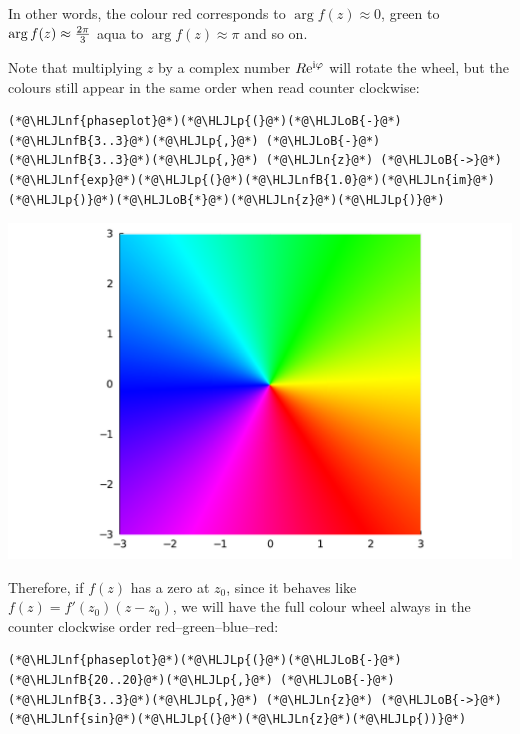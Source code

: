 \documentclass[12pt,a4paper]{article}
\newcommand{\HLJLn}[1]{#1}
\newcommand{\HLJLnf}[1]{\textcolor[RGB]{66,102,213}{#1}}
\newcommand{\HLJLnfB}[1]{\textcolor[RGB]{59,151,46}{#1}}
\newcommand{\HLJLoB}[1]{\textcolor[RGB]{102,102,102}{\textbf{#1}}}
\newcommand{\HLJLp}[1]{#1}
\def\I{ {\rm i} }
\def\E{ {\rm e} }
\def\endash{–}
\begin{document}
In other words, the colour red corresponds to $\arg f(z) \approx 0$, green to $\arg f(z) \approx {2 \pi \over 3}$ aqua to $\arg f(z) \approx \pi$ and so on.

Note that multiplying $z$ by a complex number $R \E^{\I \varphi}$ will rotate the wheel, but the colours still appear in the same order when read counter clockwise:


\begin{lstlisting}
(*@\HLJLnf{phaseplot}@*)(*@\HLJLp{(}@*)(*@\HLJLoB{-}@*)(*@\HLJLnfB{3..3}@*)(*@\HLJLp{,}@*) (*@\HLJLoB{-}@*)(*@\HLJLnfB{3..3}@*)(*@\HLJLp{,}@*) (*@\HLJLn{z}@*) (*@\HLJLoB{->}@*) (*@\HLJLnf{exp}@*)(*@\HLJLp{(}@*)(*@\HLJLnfB{1.0}@*)(*@\HLJLn{im}@*)(*@\HLJLp{)}@*)(*@\HLJLoB{*}@*)(*@\HLJLn{z}@*)(*@\HLJLp{)}@*)
\end{lstlisting}

\includegraphics[width=\linewidth]{jl_z7eR69/Lecture1_6_1.pdf}

Therefore, if $f(z)$ has a zero at $z_0$, since it behaves like $f(z) = f'(z_0) (z - z_0)$, we will have the full colour wheel always in the counter clockwise order red\ensuremath{\endash}green\ensuremath{\endash}blue\ensuremath{\endash}red:


\begin{lstlisting}
(*@\HLJLnf{phaseplot}@*)(*@\HLJLp{(}@*)(*@\HLJLoB{-}@*)(*@\HLJLnfB{20..20}@*)(*@\HLJLp{,}@*) (*@\HLJLoB{-}@*)(*@\HLJLnfB{3..3}@*)(*@\HLJLp{,}@*) (*@\HLJLn{z}@*) (*@\HLJLoB{->}@*) (*@\HLJLnf{sin}@*)(*@\HLJLp{(}@*)(*@\HLJLn{z}@*)(*@\HLJLp{))}@*)
\end{lstlisting}
\end{document}
